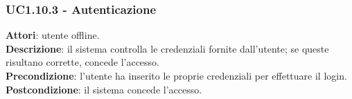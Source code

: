 	\subsubsection{UC1.10.3 - Autenticazione}{
		\label{uc1.10.3}
		\textbf{Attori}: utente offline.	\\
		\textbf{Descrizione}: il sistema controlla le credenziali fornite dall'utente; se queste risultano corrette, concede l'accesso.	\\
		\textbf{Precondizione}: l'utente  ha inserito le proprie credenziali per effettuare il login.	\\
		\textbf{Postcondizione}: il sistema concede l'accesso.	
		}